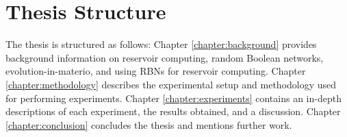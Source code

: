 \section{Thesis Structure}

The thesis is structured as follows:
Chapter \ref{chapter:background} provides background information on reservoir computing, random Boolean networks, evolution-in-materio, and using RBNs for reservoir computing.
Chapter \ref{chapter:methodology} describes the experimental setup and methodology used for performing experiments.
Chapter \ref{chapter:experiments} contains an in-depth descriptions of each experiment, the results obtained, and a discussion.
Chapter \ref{chapter:conclusion} concludes the thesis and mentions further work.
